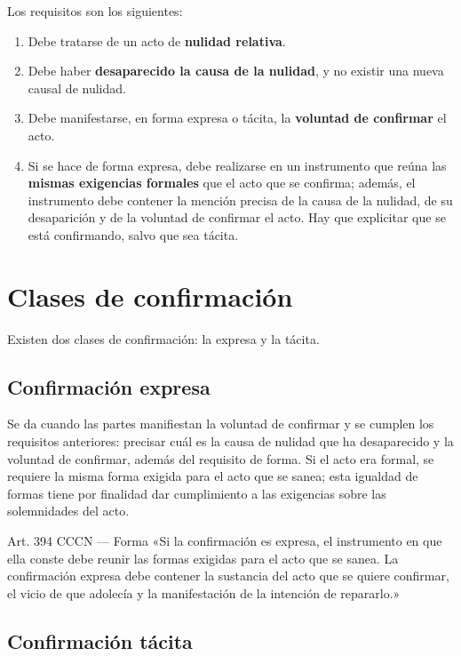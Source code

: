 \documentclass[12pt,oneside]{book}
\begin{document}
Los requisitos son los siguientes:

\begin{enumerate}
    \item Debe tratarse de un acto de \textbf{nulidad relativa}.
    \item Debe haber \textbf{desaparecido la causa de la nulidad}, y no existir una nueva causal de nulidad.
    \item Debe manifestarse, en forma expresa o tácita, la \textbf{voluntad de confirmar} el acto.
    \item Si se hace de forma expresa, debe realizarse en un instrumento que reúna las \textbf{mismas exigencias formales} que el acto que se confirma; además, el instrumento debe contener la mención precisa de la causa de la nulidad, de su desaparición y de la voluntad de confirmar el acto. Hay que explicitar que se está confirmando, salvo que sea tácita.
\end{enumerate}

\section{Clases de confirmación}

Existen dos clases de confirmación: la expresa y la tácita.

\subsection*{Confirmación expresa}

Se da cuando las partes manifiestan la voluntad de confirmar y se cumplen los requisitos anteriores: precisar cuál es la causa de nulidad que ha desaparecido y la voluntad de confirmar, además del requisito de forma. Si el acto era formal, se requiere la misma forma exigida para el acto que se sanea; esta igualdad de formas tiene por finalidad dar cumplimiento a las exigencias sobre las solemnidades del acto.

\begin{articulo}{Art. 394 CCCN --- Forma}
«Si la confirmación es expresa, el instrumento en que ella conste debe reunir las formas exigidas para el acto que se sanea. La confirmación expresa debe contener la sustancia del acto que se quiere confirmar, el vicio de que adolecía y la manifestación de la intención de repararlo.»
\end{articulo}

\subsection*{Confirmación tácita}
\end{document}
